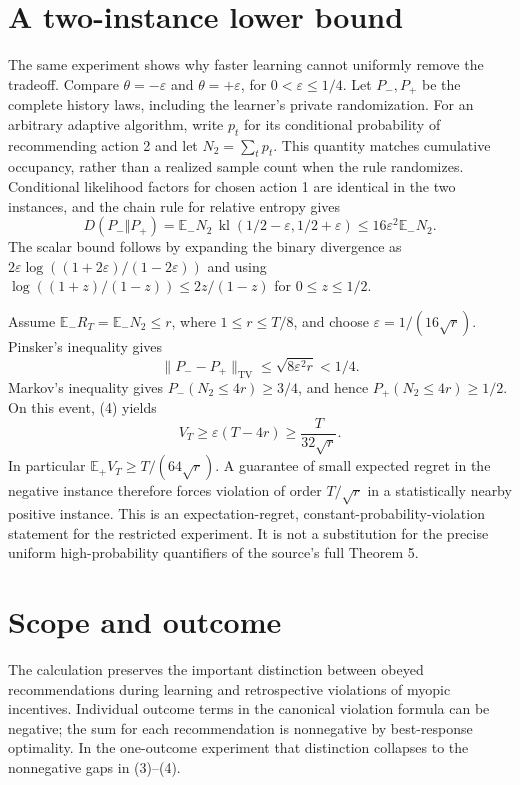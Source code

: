 \documentclass[11pt]{article}
\begin{document}
\section*{A two-instance lower bound}
The same experiment shows why faster learning cannot uniformly remove
the tradeoff. Compare $\theta=-\varepsilon$ and
$\theta=+\varepsilon$, for $0<\varepsilon\leq1/4$. Let $P_-,P_+$ be
the complete history laws, including the learner's private randomization.
For an arbitrary adaptive algorithm, write $p_t$ for its conditional
probability of recommending action 2 and let $N_2=\sum_t p_t$.
This quantity matches cumulative occupancy, rather than a realized
sample count when the rule randomizes. Conditional likelihood factors
for chosen action 1 are identical in the two instances, and the
chain rule for relative entropy gives
\[
 D(P_-\Vert P_+)
 =\mathbb E_-N_2\,
   \operatorname{kl}(1/2-\varepsilon,1/2+\varepsilon)
 \leq16\varepsilon^2\mathbb E_-N_2.
 \tag{9}
\]
The scalar bound follows by expanding the binary divergence as
$2\varepsilon\log((1+2\varepsilon)/(1-2\varepsilon))$ and using
$\log((1+z)/(1-z))\leq2z/(1-z)$ for $0\leq z\leq1/2$.

Assume $\mathbb E_-R_T=\mathbb E_-N_2\leq r$, where
$1\leq r\leq T/8$, and choose $\varepsilon=1/(16\sqrt r)$.
Pinsker's inequality gives
\[
 \|P_--P_+\|_{\mathrm{TV}}
 \leq\sqrt{8\varepsilon^2r}<1/4.
\]
Markov's inequality gives $P_-(N_2\leq4r)\geq3/4$, and hence
$P_+(N_2\leq4r)\geq1/2$. On this event, (4) yields
\[
 V_T\geq\varepsilon(T-4r)\geq\frac{T}{32\sqrt r}.
 \tag{10}
\]
In particular $\mathbb E_+V_T\geq T/(64\sqrt r)$. A guarantee of
small expected regret in the negative instance therefore forces
violation of order $T/\sqrt r$ in a statistically nearby positive
instance. This is an expectation-regret, constant-probability-violation
statement for the restricted experiment. It is not a substitution for
the precise uniform high-probability quantifiers of the source's
full Theorem 5.

\section*{Scope and outcome}
The calculation preserves the important distinction between obeyed
recommendations during learning and retrospective violations of myopic
incentives. Individual outcome terms in the canonical violation formula
can be negative; the sum for each recommendation is nonnegative by
best-response optimality. In the one-outcome experiment that distinction
collapses to the nonnegative gaps in (3)--(4).
\end{document}
